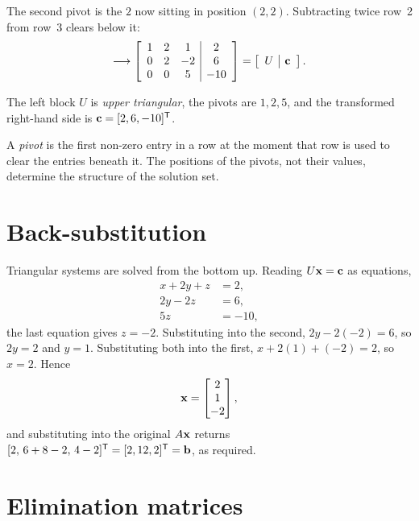 The second pivot is the \(2\) now sitting in position \((2,2)\). Subtracting
twice row~2 from row~3 clears below it:
\[
	\longrightarrow
	\left[\begin{array}{ccc|c}
		1&2&1&2\\ 0&2&-2&6\\ 0&0&5&-10
	\end{array}\right]
	=\left[\begin{array}{c|c}U&\mathbf{c}\end{array}\right].
\]

The left block \(U\) is \emph{upper triangular}, the pivots are \(1,2,5\), and
the transformed right-hand side is \(\mathbf{c}=[2,6,-10]^{\mathsf{T}}\).

\begin{definition}
A \emph{pivot} is the first non-zero entry in a row at the moment that row is
used to clear the entries beneath it. The positions of the pivots, not their
values, determine the structure of the solution set.
\end{definition}

\section{Back-substitution}

Triangular systems are solved from the bottom up. Reading \(U\mathbf{x}=\mathbf{c}\)
as equations,
\begin{align*}
	x+2y+z &= 2,\\
	2y-2z  &= 6,\\
	5z     &= -10,
\end{align*}
the last equation gives \(z=-2\). Substituting into the second,
\(2y-2(-2)=6\), so \(2y=2\) and \(y=1\). Substituting both into the first,
\(x+2(1)+(-2)=2\), so \(x=2\). Hence
\[
	\mathbf{x}=\begin{bmatrix}2\\1\\-2\end{bmatrix},
\]
and substituting into the original \(A\mathbf{x}\) returns
\([2,\,6+8-2,\,4-2]^{\mathsf{T}}=[2,12,2]^{\mathsf{T}}=\mathbf{b}\), as required.


\section{Elimination matrices}

